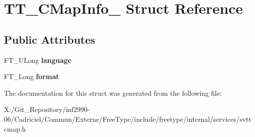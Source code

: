 \hypertarget{struct_t_t___c_map_info__}{\section{T\-T\-\_\-\-C\-Map\-Info\-\_\- Struct Reference}
\label{struct_t_t___c_map_info__}
}
\subsection*{Public Attributes}
\begin{DoxyCompactItemize}
\item 
\hypertarget{struct_t_t___c_map_info___a4096f460af57f87cb9434a411c502d86}{F\-T\-\_\-\-U\-Long {\bfseries language}}\label{struct_t_t___c_map_info___a4096f460af57f87cb9434a411c502d86}

\item 
\hypertarget{struct_t_t___c_map_info___a122d56b4755597f134fcf4865cb0a4fc}{F\-T\-\_\-\-Long {\bfseries format}}\label{struct_t_t___c_map_info___a122d56b4755597f134fcf4865cb0a4fc}

\end{DoxyCompactItemize}


The documentation for this struct was generated from the following file\-:\begin{DoxyCompactItemize}
\item 
X\-:/\-Git\-\_\-\-Repository/inf2990-\/06/\-Cadriciel/\-Commun/\-Externe/\-Free\-Type/include/freetype/internal/services/svttcmap.\-h\end{DoxyCompactItemize}
